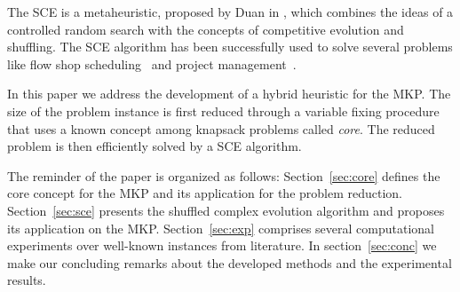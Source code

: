 The SCE is a metaheuristic, proposed by Duan in \cite{duan1992effective},
which combines the ideas of a controlled random search with the concepts
of competitive evolution and shuffling.
The SCE algorithm has been successfully used to solve several problems
like flow shop scheduling~\cite{zhao2014shuffled} and project management~\cite{elbeltagi2007modified}.

In this paper we address the development of a hybrid heuristic for the MKP.
The size of the problem instance is first reduced through a variable fixing
procedure that uses a known concept among knapsack problems called \emph{core}.
The reduced problem is then efficiently solved by a SCE algorithm.

The reminder of the paper is organized as follows:
Section~\ref{sec:core} defines the core concept for the MKP and its application
for the problem reduction.
Section~\ref{sec:sce} presents the shuffled complex evolution algorithm
and proposes its application on the MKP.
Section~\ref{sec:exp} comprises several computational experiments over well-known
instances from literature.
In section~\ref{sec:conc} we make our concluding remarks about the developed
methods and the experimental results.

